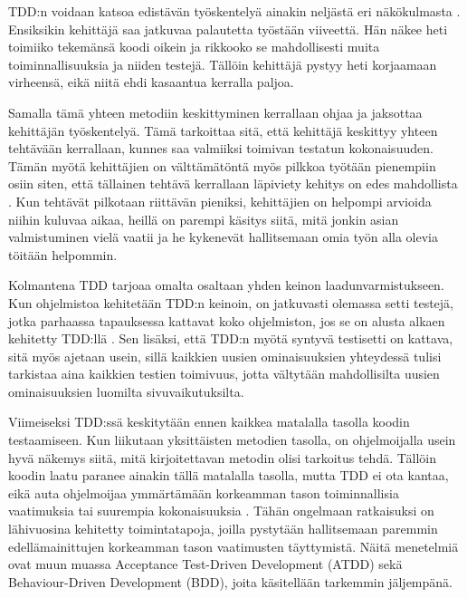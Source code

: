 \documentclass[finnish,nonumbib,nocopyright]{gradu2}
\begin{document}
TDD:n voidaan katsoa edistävän työskentelyä ainakin neljästä eri näkökulmasta \cite{tddeff}. Ensiksikin kehittäjä saa jatkuvaa palautetta työstään viiveettä. Hän näkee heti toimiiko tekemänsä koodi oikein ja rikkooko se mahdollisesti muita toiminnallisuuksia ja niiden testejä. Tällöin kehittäjä pystyy heti korjaamaan virheensä, eikä niitä ehdi kasaantua kerralla paljoa.

Samalla tämä yhteen metodiin keskittyminen kerrallaan ohjaa ja jaksottaa kehittäjän työskentelyä. Tämä tarkoittaa sitä, että kehittäjä keskittyy yhteen tehtävään kerrallaan, kunnes saa valmiiksi toimivan testatun kokonaisuuden. Tämän myötä kehittäjien on välttämätöntä myös pilkkoa työtään pienempiin osiin siten, että tällainen tehtävä kerrallaan läpiviety kehitys on edes mahdollista \cite{tddeff}. Kun tehtävät pilkotaan riittävän pieniksi, kehittäjien on helpompi arvioida niihin kuluvaa aikaa, heillä on parempi käsitys siitä, mitä jonkin asian valmistuminen vielä vaatii ja he kykenevät hallitsemaan omia työn alla olevia töitään helpommin.

Kolmantena TDD tarjoaa omalta osaltaan yhden keinon laadunvarmistukseen. Kun ohjelmistoa kehitetään TDD:n keinoin, on jatkuvasti olemassa setti testejä, jotka parhaassa tapauksessa kattavat koko ohjelmiston, jos se on alusta alkaen kehitetty TDD:llä \cite{tddeff}. Sen lisäksi, että TDD:n myötä syntyvä testisetti on kattava, sitä myös ajetaan usein, sillä kaikkien uusien ominaisuuksien yhteydessä tulisi tarkistaa aina kaikkien testien toimivuus, jotta vältytään mahdollisilta uusien ominaisuuksien luomilta sivuvaikutuksilta.
 
Viimeiseksi TDD:ssä keskitytään ennen kaikkea matalalla tasolla koodin testaamiseen. Kun liikutaan yksittäisten metodien tasolla, on ohjelmoijalla usein hyvä näkemys siitä, mitä kirjoitettavan metodin olisi tarkoitus tehdä. Tällöin koodin laatu paranee ainakin tällä matalalla tasolla, mutta TDD ei ota kantaa, eikä auta ohjelmoijaa ymmärtämään korkeamman tason toiminnallisia vaatimuksia tai suurempia kokonaisuuksia \cite{tdd}. Tähän ongelmaan ratkaisuksi on lähivuosina kehitetty toimintatapoja, joilla pystytään hallitsemaan paremmin edellämainittujen korkeamman tason vaatimusten täyttymistä. Näitä menetelmiä ovat muun muassa Acceptance Test-Driven Development (ATDD) sekä Behaviour-Driven Development (BDD), joita käsitellään tarkemmin jäljempänä.
\end{document}
